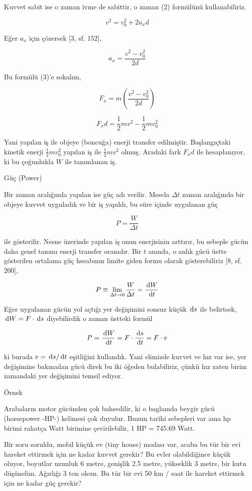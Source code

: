 \documentclass[12pt,fleqn]{article}\usepackage{../../common}
\begin{document}
Kuvvet sabit ise o zaman ivme de sabittir, o zaman (2) formülünü
kullanabiliriz. 

$$
v^2 = v_0^2 + 2 a_x d
$$

Eğer $a_x$ için çözersek [3, sf. 152], 

$$
a_x = \frac{v^2 - v_0^2 }{2 d}
$$

Bu formülü (3)'e sokalım,

$$
F_x = m \left( \frac{v^2 - v_0^2 }{2d} \right)
$$

$$
F_x d = \frac{1}{2} m v^2 - \frac{1}{2} m v_0^2
$$

Yani yapılan iş ile objeye (boncuğa) enerji transfer
edilmiştir. Başlangıçtaki kinetik enerji $\frac{1}{2} m v_0^2$ yapılan iş
ile $\frac{1}{2} m v^2$ olmuş. Aradaki fark $F_x d$ ile hesaplanıyor, ki bu
çoğunlukla $W$ ile tanımlanan iş. 

Güç (Power)

Bir zaman aralığında yapılan ise güç adı verilir. Mesela $\Delta t$ zaman
aralığında bir objeye kuvvet uyguladık ve bir iş yapıldı, bu süre içinde
uygulanan güç

$$
P = \frac{W}{\Delta t}
$$

ile gösterilir. Nesne üzerinde yapılan iş onun enerjisinin arttırır, bu sebeple
gücün daha genel tanımı enerji transfer oranıdır. Bir $t$ anında, o anlık gücü
üstte gösterilen ortalama güç hesabının limite giden formu olarak
gösterebiliriz [8, sf. 200],

$$
P \equiv \lim_{\Delta t \to 0} \frac{W}{\Delta t} = \frac{\,\mathrm{d} W}{\,\mathrm{d} t}
$$

Eğer uygulanan gücün yol açtığı yer değişimini sonsuz küçük $\,\mathrm{d} s$ ile
belirtsek, $\,\mathrm{d} W = F \cdot \,\mathrm{d} s$ diyebilirdik o zaman üstteki formül

$$
P = \frac{\,\mathrm{d} W}{\,\mathrm{d} t} = F \cdot \frac{\,\mathrm{d} s}{\,\mathrm{d} t} = F \cdot v
$$

ki burada $v = \,\mathrm{d} s / \,\mathrm{d} t$ eşitliğini kullandık. Yani elimizde kuvvet ve hız
var ise, yer değişimine bakmadan gücü direk bu iki öğeden bulabiliriz, çünkü hız
zaten birim zamandaki yer değişimini temsil ediyor.

Örnek

Arabaların motor gücünden çok bahsedilir, ki o baglamda beygir gücü (horsepower
-HP-) kelimesi çok duyulur. Bunun tarihi sebepleri var ama hp birimi rahatça
Watt birimine çevirilebilir, 1 HP = 745.69 Watt.

Bir soru soruldu, mobil küçük ev (tiny house) modası var, acaba bu tür bir evi
hareket ettirmek için ne kadar kuvvet gerekir? Bu evler olabildiğince küçük
oluyor, boyutlar uzunluk 6 metre, genişlik 2.5 metre, yükseklik 3 metre, bir
kutu düşünelim. Ağırlığı 3 ton olsun. Bu tür bir evi 50 km / saat ile hareket
ettirmek için ne kadar güç gerekir?
\end{document}
